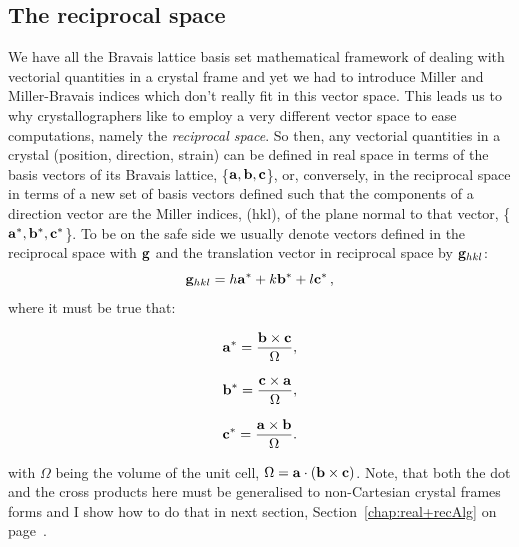 \subsection{The reciprocal space}
\label{sec:recMB}
We have all the Bravais lattice basis set mathematical framework of dealing with vectorial quantities in a crystal frame and yet we had to introduce Miller and Miller-Bravais indices which don't really fit in this vector space. This leads us to why crystallographers like to employ a very different vector space to ease computations, namely the \textit{reciprocal space}. So then, any vectorial quantities in a crystal (\ie position, direction, strain) can be defined in real space in terms of the basis vectors of its Bravais lattice, \{$\vb{a},\vb{b}, \vb{c}$\}, or, conversely, in the reciprocal space in terms of a new set of basis vectors defined such that the components of a direction vector are the Miller indices, \hkl(hkl), of the plane normal to that vector, \{$\vb{a^*},\vb{b^*}, \vb{c^*}$\}. To be on the safe side we usually denote vectors defined in the reciprocal space with $\vb{g}$ and the translation vector in reciprocal space by $\vb{g}_{hkl}$:
\begin{equation}
\label{eq:ghkl}
\vb{g}_{hkl} = h\vb{a^*}+k\vb{b^*}+l\vb{c^*}\,,
\end{equation}
where it must be true that:
\noindent\begin{minipage}{.2\linewidth}
\begin{equation*}
  \vb{a^*} = \frac{\vb{b} \times \vb{c}}{\Omega},
\end{equation*}
\end{minipage}%
\begin{minipage}{.2\linewidth}
\begin{equation*}
   \vb{b^*} = \frac{\vb{c} \times \vb{a}}{\Omega},
\end{equation*}
\end{minipage}%
\begin{minipage}{.285\linewidth}
\begin{equation}
\label{eq:recVectors}
  \vb{c^*} = \frac{\vb{a} \times \vb{b}}{\Omega}.
\end{equation}
\end{minipage}

\noindent with $\Omega$ being the volume of the unit cell, $\Omega=\vb{a}\cdot (\vb{b}\times \vb{c})$. Note, that both the dot and the cross products here must be generalised to non-Cartesian crystal frames forms and I show how to do that in next section, Section~\ref{chap:real+recAlg} on page~\pageref{chap:real+recAlg}. 


